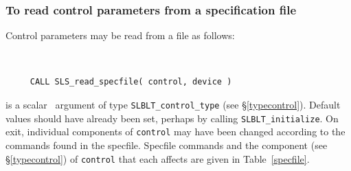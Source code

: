 \documentclass{galahad}
\newcommand{\packagename}{SLBLT}
\begin{document}
\subsubsection{To read control parameters from a specification file}
\label{readspec}

Control parameters may be read from a file as follows:
\hskip0.5in

\def\baselinestretch{0.8}
{\tt
\begin{verbatim}
     CALL SLS_read_specfile( control, device )
\end{verbatim}
}
\def\baselinestretch{1.0}

\begin{description}
 is a scalar \intentinout\ argument of type
{\tt \packagename\_control\_type}
(see \S\ref{typecontrol}).
Default values should have already been set, perhaps by calling
{\tt \packagename\_initialize}.
On exit, individual components of {\tt control} may have been changed
according to the commands found in the specfile. Specfile commands and
the component (see \S\ref{typecontrol}) of {\tt control}
that each affects are given in Table~\ref{specfile}.


\end{description}
\end{document}
